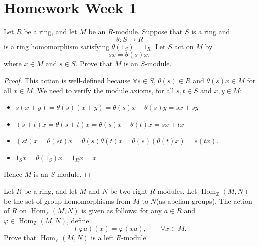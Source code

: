 \section{Homework Week 1}

\begin{exercise}
    Let $R$ be a ring, and let $M$ be an $R$-module. Suppose that $S$ is a ring and
    \[
        \theta : S \to R
    \]
    is a ring homomorphism satisfying $\theta(1_S)=1_R$. Let $S$ act on $M$ by
    \[
        sx=\theta(s)x,
    \]
    where $x\in M$ and $s\in S$. Prove that $M$ is an $S$-module.
\end{exercise}

\begin{proof}
    This action is well-defined because $\forall s \in S$, $\theta(s) \in R$ and $\theta(s)x \in M$ for all $x \in M$. We need to verify the module axioms, for all $s, t \in S$ and $x, y \in M$:
    \begin{itemize}
        \item $s(x+y) = \theta(s)(x+y) = \theta(s)x + \theta(s)y = sx + sy$ \item $(s+t)x = \theta(s+t)x = \theta(s)x + \theta(t)x = sx + tx$ \item $(st)x=\theta(st)x=\theta(s)\theta(t)x=\theta(s)(\theta(t)x)=s(tx)$.
        \item $1_S x = \theta(1_S)x = 1_R x = x$ \end{itemize}
    Hence $M$ is an $S$-module.
\end{proof}

\begin{exercise}
    Let $R$ be a ring, and let $M$ and $N$ be two right $R$-modules. Let $\operatorname{Hom}_{\mathbb{Z}}(M,N)$ be the set of group homomorphisms from $M$ to $N$(as abelian groups). The action of $R$ on $\operatorname{Hom}_{\mathbb{Z}}(M,N)$ is given as follows: for any $a\in R$ and $\varphi\in \operatorname{Hom}_{\mathbb{Z}}(M,N)$, define
    \[
        (\varphi a)(x)=\varphi(xa), \qquad \forall x\in M.
    \]
    Prove that $\operatorname{Hom}_{\mathbb{Z}}(M,N)$ is a left $R$-module.
\end{exercise}


